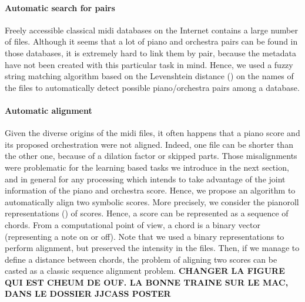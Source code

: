 \documentclass[twoside,twocolumn]{article}
\begin{document}
\paragraph{Automatic search for pairs}
Freely accessible classical midi databases on the Internet contains a large number of files. Although it seems that a lot of piano and orchestra pairs can be found in those databases, it is extremely hard to link them by pair, because the metadata have not been created with this particular task in mind. Hence, we used a fuzzy string matching algorithm based on the Levenshtein distance (\cite{fuzzywuzzy}) on the names of the files to automatically detect possible piano/orchestra pairs among a database.

\paragraph{Automatic alignment}
Given the diverse origins of the midi files, it often happens that a piano score and its proposed orchestration were not aligned. Indeed, one file can be shorter than the other one, because of a dilation factor or skipped parts.
Those misalignments were problematic for the learning based tasks we introduce in the next section, and in general for any processing which intends to take advantage of the joint information of the piano and orchestra score. Hence, we propose an algorithm to automatically align two symbolic scores.
More precisely, we consider the pianoroll representations () of scores. Hence, a score can be represented as a sequence of chords. From a computational point of view, a chord is a binary vector (representing a note on or off). Note that we used a binary representations to perform alignment, but preserved the intensity in the files. Then, if we manage to define a distance between chords, the problem of aligning two scores can be casted as a classic sequence alignment problem.
\textbf{CHANGER LA FIGURE QUI EST CHEUM DE OUF. LA BONNE TRAINE SUR LE MAC, DANS LE DOSSIER JJCASS POSTER}
\end{document}
